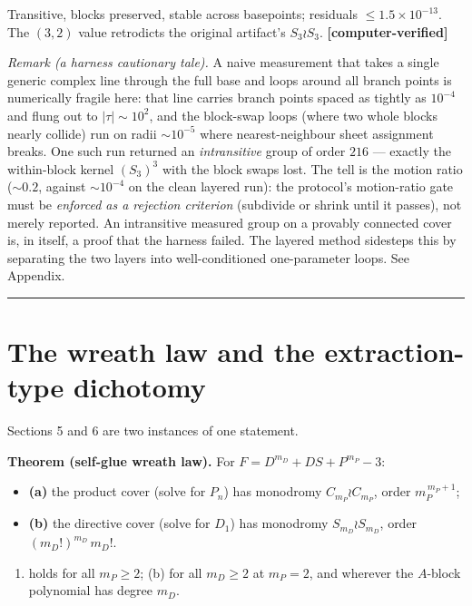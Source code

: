 \documentclass[11pt]{article}
\providecommand{\tightlist}{\setlength{\itemsep}{0pt}\setlength{\parskip}{0pt}}
\theoremstyle{plain}
\theoremstyle{definition}
\theoremstyle{remark}
\begin{document}
Transitive, blocks preserved, stable across basepoints; residuals \(\le 1.5\times 10^{-13}\). The \((3,2)\) value retrodicts the original artifact's \(S_3\wr S_3\). \textbf{{[}computer-verified{]}}

\emph{Remark (a harness cautionary tale).} A naive measurement that takes a single generic complex line through the full base and loops around all branch points is numerically fragile here: that line carries branch points spaced as tightly as \(10^{-4}\) and flung out to \(|\tau|\sim 10^2\), and the block-swap loops (where two whole blocks nearly collide) run on radii \(\sim 10^{-5}\) where nearest-neighbour sheet assignment breaks. One such run returned an \emph{intransitive} group of order \(216\) --- exactly the within-block kernel \((S_3)^3\) with the block swaps lost. The tell is the motion ratio (\(\sim 0.2\), against \(\sim 10^{-4}\) on the clean layered run): the protocol's motion-ratio gate must be \emph{enforced as a rejection criterion} (subdivide or shrink until it passes), not merely reported. An intransitive measured group on a provably connected cover is, in itself, a proof that the harness failed. The layered method sidesteps this by separating the two layers into well-conditioned one-parameter loops. See Appendix.

\begin{center}\rule{0.5\linewidth}{0.5pt}\end{center}

\hypertarget{the-wreath-law-and-the-extraction-type-dichotomy}{%
\section{The wreath law and the extraction-type dichotomy}\label{the-wreath-law-and-the-extraction-type-dichotomy}}

Sections 5 and 6 are two instances of one statement.

\textbf{Theorem (self-glue wreath law).} For \(F = D^{m_D} + DS + P^{m_P} - 3\):

\begin{itemize}
\tightlist
\item
  \textbf{(a)} the product cover (solve for \(P_n\)) has monodromy \(C_{m_P}\wr C_{m_P}\), order \(m_P^{\,m_P+1}\);
\item
  \textbf{(b)} the directive cover (solve for \(D_1\)) has monodromy \(S_{m_D}\wr S_{m_D}\), order \((m_D!)^{m_D}\,m_D!\).
\end{itemize}

\begin{enumerate}
\def\labelenumi{(\alph{enumi})}
\tightlist
\item
  holds for all \(m_P\ge 2\); (b) for all \(m_D\ge 2\) at \(m_P=2\), and wherever the \(A\)-block polynomial has degree \(m_D\).
\end{enumerate}
\end{document}
